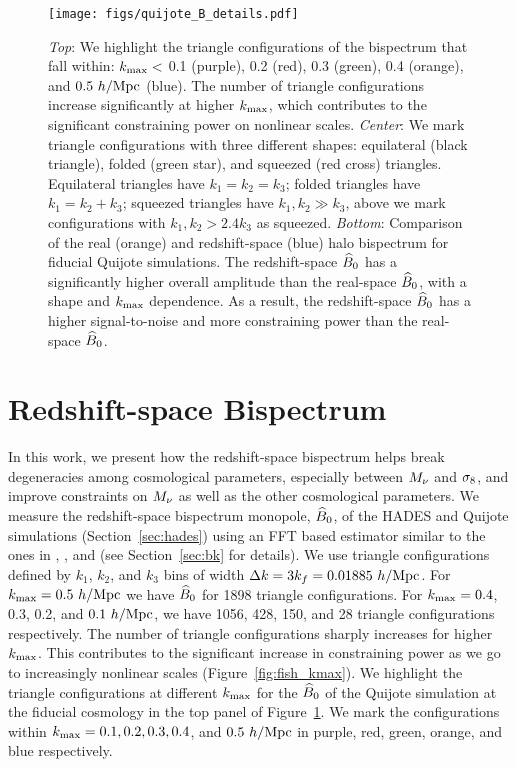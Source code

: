 \begin{figure}
\begin{center}
    \texttt{[image: figs/quijote\_B\_details.pdf]}
    \caption{
        {\em Top}: We highlight the triangle configurations of the bispectrum that fall within: 
        $k_{\rm max} <$ 0.1 (purple), 0.2 (red), 0.3 (green), 0.4 (orange), and $0.5~h/{\rm Mpc}$ (blue). The number of 
        triangle configurations increase significantly at higher $k_{\rm max}$, which contributes to the 
        significant constraining power on nonlinear scales. 
        {\em Center}: We mark triangle configurations with three different shapes:
        equilateral (black triangle), folded (green star), and squeezed (red cross) triangles. Equilateral 
        triangles have $k_1 = k_2 = k_3$; folded triangles have $k_1 = k_2 + k_3$; squeezed triangles have 
        $k_1, k_2 \gg k_3$, above we mark configurations with $k_1, k_2 > 2.4k_3$ as squeezed. 
        {\em Bottom}: Comparison of the real (orange) and redshift-space (blue) halo bispectrum for 
        fiducial Quijote simulations. The redshift-space $\widehat{B}_0$ has a significantly higher 
        overall amplitude than the real-space $\widehat{B}_0$, with a shape and $k_{\rm max}$ dependence. 
        As a result, the redshift-space $\widehat{B}_0$ has a higher signal-to-noise and more 
        constraining power than the real-space $\widehat{B}_0$.  
    } 
\label{fig:bk_details}
\end{center}
\end{figure}
\section{Redshift-space Bispectrum} \label{sec:bk_details}
In this work, we present how the redshift-space bispectrum helps break degeneracies 
among cosmological parameters, especially between $M_\nu$ and $\sigma_8$, and improve 
constraints on $M_\nu$ as well as the other cosmological parameters. We measure 
the redshift-space bispectrum monopole, $\widehat{B}_0$, of the HADES and Quijote simulations 
(Section~\ref{sec:hades}) using an FFT based estimator similar to the ones in 
\cite{sefusatti2005a}, \cite{scoccimarro2015}, and \cite{sefusatti2016} 
(see Section~\ref{sec:bk} for details). We use triangle configurations defined by 
$k_1$, $k_2$, and $k_3$ bins of width $\Delta k = 3k_f = 0.01885~h/{\rm Mpc}$. 
For $k_{\rm max} = 0.5~h/{\rm Mpc}$ we have $\widehat{B}_0$ for 1898 
triangle configurations. For $k_{\rm max} = 0.4$, 0.3, 0.2, and $0.1~h/{\rm Mpc}$, 
we have 1056, 428, 150, and 28 triangle configurations respectively. The number
of triangle configurations sharply increases for higher $k_{\rm max}$. This
contributes to the significant increase in constraining power as we go to increasingly 
nonlinear scales (Figure~\ref{fig:fish_kmax}). We highlight the triangle 
configurations at different $k_{\rm max}$ for the $\widehat{B}_0$ of the Quijote simulation 
at the fiducial cosmology in the top panel of Figure~\ref{fig:bk_details}. We mark 
the configurations within $k_{\rm max} = 0.1, 0.2, 0.3, 0.4$, and $0.5~h/{\rm Mpc}$ 
in purple, red, green, orange, and blue respectively. 

